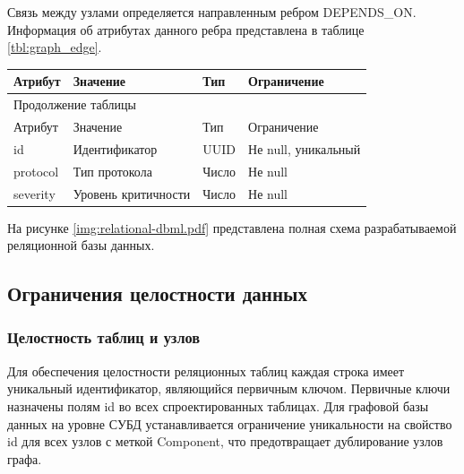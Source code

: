 Связь между узлами определяется направленным ребром DEPENDS\_ON. Информация об атрибутах
данного ребра представлена в таблице \ref{tbl:graph_edge}.

\begin{center}
    \begin{tabularx}{\textwidth}{|X|X|X|X|}
        \caption{\label{tbl:graph_edge}Информация об атрибутах связи DEPENDS\_ON} \\ \hline
        Атрибут & Значение & Тип & Ограничение \\ \hline
        \endfirsthead

        \multicolumn{4}{l}{{Продолжение таблицы\ \thetable{}}} \\ \hline
        Атрибут & Значение & Тип & Ограничение \\ \hline
        \endhead

        \endfoot
        \endlastfoot

        id & Идентификатор & UUID & Не null, уникальный \\ \hline
        protocol & Тип протокола & Число & Не null \\ \hline
        severity & Уровень критичности & Число & Не null \\ \hline
    \end{tabularx}
\end{center}

На рисунке \ref{img:relational-dbml.pdf} представлена полная схема разрабатываемой реляционной базы данных.


\clearpage

\subsection{Ограничения целостности данных}

\subsubsection{Целостность таблиц и узлов}
Для обеспечения целостности реляционных таблиц каждая строка имеет уникальный
идентификатор, являющийся первичным ключом. Первичные ключи назначены полям id во всех
спроектированных таблицах. Для графовой базы данных на уровне СУБД устанавливается
ограничение уникальности на свойство id для всех узлов с меткой Component, что
предотвращает дублирование узлов графа.

